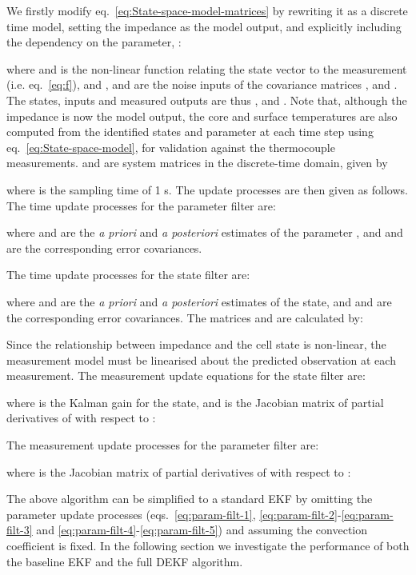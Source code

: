 \documentclass[journal, english]{IEEEtran}
\begin{document}
We firstly modify eq.\ \ref{eq:State-space-model-matrices} by rewriting it as a discrete time model, setting the impedance as the model output, and explicitly including the dependency on the parameter, :

where  and  is the non-linear
function relating the state vector to the measurement (i.e. eq.\ \ref{eq:f}), and ,  and  are the noise inputs of the covariance matrices ,
 and .
The states, inputs and measured outputs are  thus ,
	 and 
	.
Note that, although the impedance is now the model output, the core and surface temperatures are also computed from the identified states and parameter at each time step using eq.\ \ref{eq:State-space-model}, for validation against the thermocouple measurements.
 and 
are system matrices in the discrete-time domain, given by

where  is the sampling time of 1 s. The update processes
are then given as follows. The time update processes for the parameter
filter are:

where  and  are the \emph{a priori
}and \emph{a posteriori} estimates of the parameter , and 
and  are the corresponding\emph{ }error covariances. 

The time update processes for the state filter are:

where  and  are
the \emph{a priori }and \emph{a posteriori} estimates of the state,
and  and 
are the corresponding\emph{ }error covariances. The matrices 
and  are calculated by:

Since the relationship between impedance and the cell state is non-linear,
the measurement model must be linearised about the predicted observation
at each measurement. The measurement update equations for the state
filter are:

where  is the Kalman gain
for the state,\emph{ }and  is the Jacobian
matrix of partial derivatives of  with respect to :

The measurement update processes for the parameter filter are:

where  is the Jacobian matrix of partial derivatives of
 with respect to :


The above algorithm can be simplified to a standard EKF by omitting the parameter update processes (eqs.\ \ref{eq:param-filt-1}, \ref{eq:param-filt-2}-\ref{eq:param-filt-3} and \ref{eq:param-filt-4}-\ref{eq:param-filt-5}) and assuming the convection coefficient is fixed. In the following section we investigate the performance of both the baseline EKF and the full DEKF algorithm.
\end{document}
